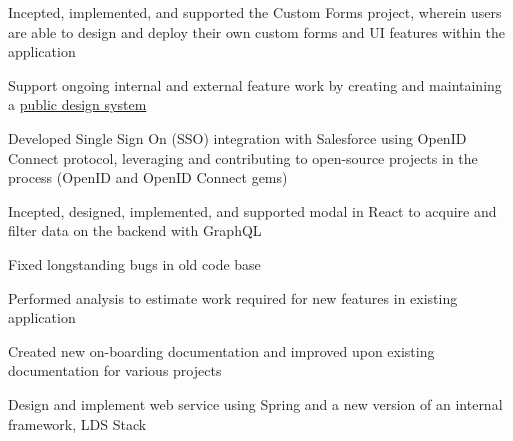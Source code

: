 \documentclass[]{resume-openfont}
\begin{document}
\begin{minipage}[t]{0.66\textwidth}
\vspace{\topsep}
\begin{tightemize}
    \item Incepted, implemented, and supported the Custom Forms project, wherein users are able to design and deploy their own custom forms and UI features within the application
    \item Support ongoing internal and external feature work by creating and maintaining a \href{https://mavenlink.github.io/design-system/master}{public design system}
    \item Developed Single Sign On (SSO) integration with Salesforce using OpenID Connect protocol, leveraging and contributing to open-source projects in the process (OpenID and OpenID Connect gems)
	\item Incepted, designed, implemented, and supported modal in React to acquire and filter data on the backend with GraphQL
\end{tightemize}
\sectionsep

\vspace{\topsep}
\begin{tightemize}
	\item Fixed longstanding bugs in old code base
    \item Performed analysis to estimate work required for new features in existing application
    \item Created new on-boarding documentation and improved upon existing documentation for various projects
    \item Design and implement web service using Spring and a new version of an internal framework, LDS Stack
\end{tightemize}
\sectionsep

\end{minipage} 
\end{document}
